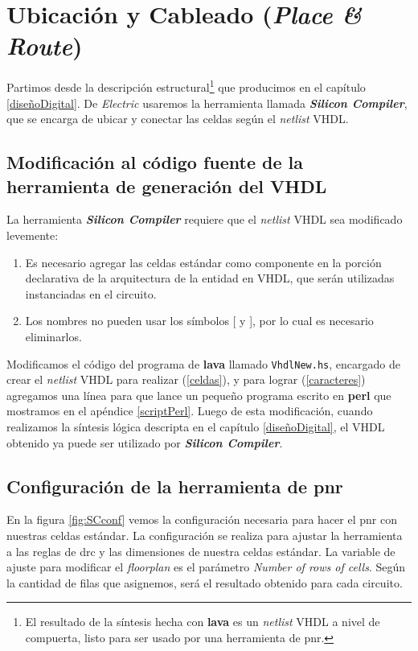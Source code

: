 \section{Ubicación y Cableado (\emph{Place \& Route})}
Partimos desde la descripción estructural\footnote{El resultado de la síntesis hecha con \textbf{lava} es un \emph{netlist} VHDL a nivel de compuerta, listo para ser usado por una herramienta de \gls{pnr}.} que producimos en el capítulo \ref{diseñoDigital}. De \emph{Electric} usaremos la herramienta llamada \textbf{\emph{Silicon Compiler}}, que se encarga de ubicar y conectar las celdas según el \emph{netlist} VHDL.

\subsection{Modificación al código fuente de la herramienta de generación del  VHDL} 

La herramienta \textbf{\emph{Silicon Compiler}} requiere que el \emph{netlist} VHDL sea modificado levemente:
\begin{enumerate}
\item\label{celdas} Es necesario agregar las celdas estándar como componente en la porción declarativa de la arquitectura de la entidad  en VHDL, que serán utilizadas instanciadas en el circuito.
\item\label{caracteres} Los nombres no pueden usar los símbolos [ y ], por lo cual es necesario eliminarlos.
\end{enumerate} 
 
Modificamos el código del programa de \textbf{lava} llamado \verb|VhdlNew.hs|, encargado de crear el \emph{netlist} VHDL para realizar (\ref{celdas}), y para lograr (\ref{caracteres}) agregamos una línea para que lance un pequeño programa escrito en \textbf{perl} que mostramos en el apéndice \ref{scriptPerl}. Luego de esta modificación, cuando realizamos la síntesis lógica descripta en el capítulo \ref{diseñoDigital}, el  VHDL obtenido ya puede ser utilizado por \textbf{\emph{Silicon Compiler}}.



\subsection{Configuración de la herramienta de \gls{pnr}}
En la figura \ref{fig:SCconf} vemos la configuración necesaria para hacer el \gls{pnr} con nuestras celdas estándar. La configuración se realiza para ajustar la herramienta a las reglas de \gls{drc} y las dimensiones de nuestra celdas estándar. La variable de ajuste para modificar el \emph{floorplan} es el parámetro \emph{Number of rows of cells}. Según la cantidad de filas que asignemos, será el resultado obtenido para cada circuito. 


